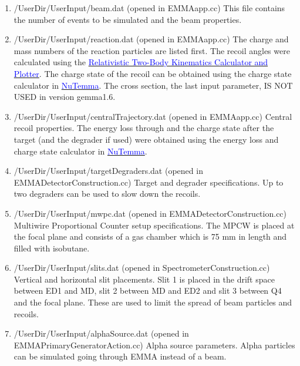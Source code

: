 \documentclass[letter,12pt]{article}
\newcommand{\filefont}[1]{{\fontfamily{pnc}\selectfont #1}\xspace}
\newcommand{\nutemma}{\href{http://davids24.triumf.ca/~oliver/NUTEMMA/home.html}{\textcolor{blue}{NuTemma}}\xspace}
\newcommand{\hrefcolor}[2]{\href{#1}{\textcolor{blue}{#2}}\xspace}
\begin{document}
\begin{enumerate}
\item \filefont{/UserDir/UserInput/beam.dat} (opened in EMMAapp.cc)
{\footnotesize }
This file contains the number of events to be simulated and the beam properties.

\item \filefont{/UserDir/UserInput/reaction.dat} (opened in EMMAapp.cc)
{\footnotesize }
The charge and mass numbers of the reaction particles are listed first. The recoil angles were calculated using the \hrefcolor{http://www.skisickness.com/2010/04/21/}{Relativistic Two-Body Kinematics Calculator and Plotter}. The charge state of the recoil can be obtained using the charge state calculator in \nutemma. The cross section, the last input parameter, IS NOT USED in version gemma1.6.

\item \filefont{/UserDir/UserInput/centralTrajectory.dat} (opened in EMMAapp.cc)
{\footnotesize }
Central recoil properties. The energy loss through and the charge state after the target (and the degrader if used) were obtained using the energy loss  and charge state calculator in \nutemma.

\item \filefont{/UserDir/UserInput/targetDegraders.dat} (opened in EMMADetectorConstruction.cc)
{\footnotesize }
Target and degrader specifications. Up to two degraders can be used to slow down the recoils.

\item \filefont{/UserDir/UserInput/mwpc.dat} (opened in EMMADetectorConstruction.cc)
{\footnotesize }
Multiwire Proportional Counter setup specifications. The MPCW is placed at the focal plane and consists of a gas chamber which is 75 mm in length and filled with isobutane.

\item \filefont{/UserDir/UserInput/slits.dat} (opened in SpectrometerConstruction.cc)
{\footnotesize }
Vertical and horizontal slit placements. Slit 1 is placed in the drift space between ED1 and MD, slit 2 between MD and ED2 and slit 3 between Q4 and the focal plane. These are used to limit the spread of beam particles and recoils.

\item \filefont{/UserDir/UserInput/alphaSource.dat} (opened in EMMAPrimaryGeneratorAction.cc)
{\footnotesize }
Alpha source parameters. Alpha particles can be simulated going through EMMA instead of a beam.

\end{enumerate}
\end{document}

